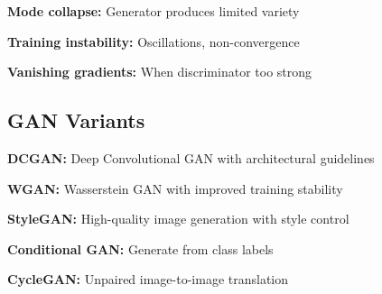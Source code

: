 \textbf{Mode collapse:} Generator produces limited variety

\textbf{Training instability:} Oscillations, non-convergence

\textbf{Vanishing gradients:} When discriminator too strong

\subsection{GAN Variants}

\textbf{DCGAN:} Deep Convolutional GAN with architectural guidelines

\textbf{WGAN:} Wasserstein GAN with improved training stability

\textbf{StyleGAN:} High-quality image generation with style control

\textbf{Conditional GAN:} Generate from class labels

\textbf{CycleGAN:} Unpaired image-to-image translation

